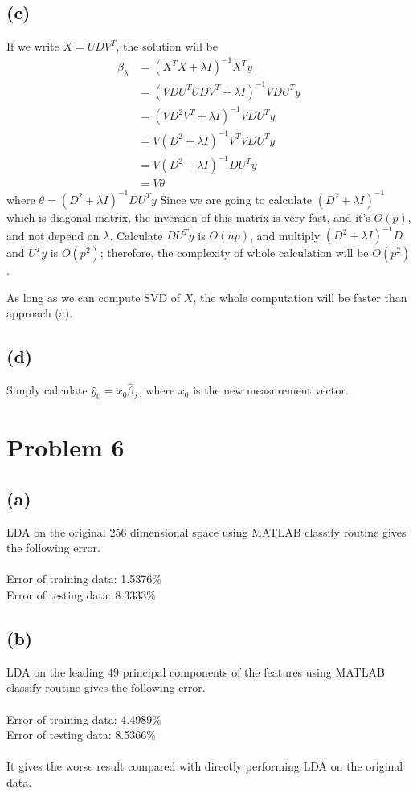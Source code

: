 \documentclass[pra,groupedaddress,amsmath,amssymb, column]{revtex4}
\begin{document}
\subsection*{(c)}
If we write $X=UDV^T$, the solution will be
\begin{align}
	\hat{\beta}_\lambda &= (X^TX + \lambda I)^{-1}X^Ty\\
	&= (VDU^TUDV^T + \lambda I)^{-1}VDU^Ty\\
	&=(VD^2V^T + \lambda I)^{-1}VDU^Ty\\
	&=V(D^2+ \lambda I)^{-1}V^T VDU^Ty\\
	&=V(D^2+ \lambda I)^{-1}DU^Ty\\
	&=V\theta
\end{align}
where $\theta =(D^2+ \lambda I)^{-1}DU^Ty $
Since we are going to calculate $(D^2+ \lambda I)^{-1}$ which is diagonal matrix, the inversion of this matrix is very fast, and it's $O(p)$, and not depend on $\lambda$. Calculate $DU^Ty$ is $O(np)$, and multiply $(D^2+ \lambda I)^{-1}D$  and $U^Ty$ is $O(p^2)$; therefore, the complexity of whole calculation will be $O(p^2)$. 

As long as we can compute SVD of $X$, the whole computation will be faster than approach \textrm{(a)}.
\subsection*{(d)}
Simply calculate $\hat{y}_0 = x_0\hat{\beta}_\lambda$, where $x_0$ is the new measurement vector.


\section*{Problem 6}
\subsection*{(a)}
LDA on the original 256 dimensional space using MATLAB classify routine gives the following error.\\
\\
Error of training data: 1.5376\%\\
Error of testing data: 8.3333\%

\subsection*{(b)}
LDA on the leading $49$ principal components of the features using MATLAB classify routine gives the following error.\\
\\
Error of training data: 4.4989\%\\
Error of testing data: 8.5366\%
\\
\\
It gives the worse result compared with directly performing LDA on the original data. 
\end{document}
